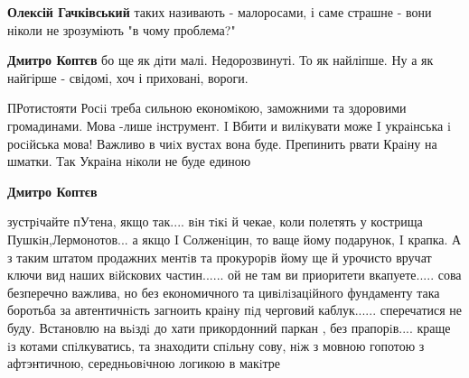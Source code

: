 \begin{itemize}
\begin{itemize}
\begin{itemize}
\textbf{Олексій Гачківський} таких називають - малоросами, і саме страшне - вони ніколи не зрозуміють "в чому проблема?"

 
\textbf{Дмитро Коптєв} бо ще як діти малі. Недорозвинуті.
То як найліпше.
Ну а як найгірше - свідомі, хоч і приховані, вороги.

 

ПРотистояти Росii треба сильною економiкою, заможними та здоровими громадинами.
Мова -лише iнструмент. I Вбити и вилiкувати може I украiнська i росiйська мова!
Важливо в чиiх вустах вона буде. Препинить рвати Краiну на шматки. Так Украiна
нiколи не буде единою


 
\textbf{Дмитро Коптєв} 

зустрiчайте пУтена, якщо так.... вiн тiкi й чекае, коли полетять у кострища
Пушкiн,Лермонотов... а якщо I Солженiцин, то ваще йому подарунок, I крапка. А з
таким штатом продажних ментiв та прокурорiв йому ще й урочисто вручат ключи вид
наших вiйскових частин...... ой не там ви приоритети вкапуете..... сова
безперечно важлива, но без економичного та цивiлiзацiйного фундаменту така
боротьба за автентичнiсть загноить краiну пiд черговий каблук...... сперечатися
не буду. Встановлю на вьiздi до хати прикордонний паркан , без прапорiв....
краще iз котами спiлкуватись, та знаходити спiльну сову, нiж з мовною гопотою з
афтэнтичною, середньовiчною логикою в макiтре

 

\end{itemize}
\end{itemize}
\end{itemize}
